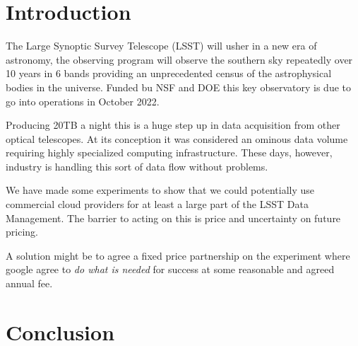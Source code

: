 \section{Introduction}
The Large Synoptic Survey Telescope (LSST) will usher in a new era of astronomy, the observing program will observe the southern sky repeatedly over 10 years in 6 bands providing an unprecedented  census of the astrophysical bodies in the universe.  Funded bu NSF and DOE this key observatory is due to go into operations in October 2022.

Producing 20TB a night this is a huge step up in data acquisition from other optical telescopes. At its conception it was considered an ominous data volume requiring highly specialized computing infrastructure. These days, however, industry is handling this sort of data flow without problems.

We have made some experiments to show that we could potentially use commercial cloud providers for at least a large part of the LSST Data Management.  The barrier to acting on this is price and uncertainty on future pricing.

A solution might be to agree a fixed price partnership on the experiment where google agree to \emph{do what is needed} for success at some reasonable and agreed annual fee.




\section{Conclusion}
